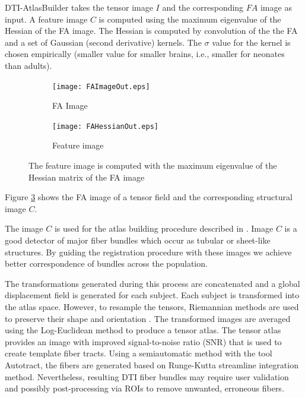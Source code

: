 \documentclass[]{spie}  %
\begin{document}
DTI-AtlasBuilder takes the tensor image $I$ and the corresponding $FA$ image as input. 
A feature image $C$ is computed using the maximum eigenvalue of the Hessian of the FA image.
The Hessian is computed by convolution of the the FA and a set of Gaussian (second derivative) kernels.
The $\sigma$ value for the kernel is chosen empirically (smaller value for smaller brains, i.e., smaller for neonates than adults). 

\begin{figure}
	\centering 

	\begin{subfigure}{0.3\textwidth}
    	\texttt{[image: FAImageOut.eps]}
    	\caption{FA Image}
    	\label{fig:FAImage}
	\end{subfigure}
	\begin{subfigure}{0.3\textwidth}
    	\texttt{[image: FAHessianOut.eps]}
    	\caption{Feature image}
    	\label{fig:FAHessian}
	\end{subfigure}
	\caption[FA and Hessian]{The feature image is computed with the maximum eigenvalue 
	of the Hessian matrix of the FA image}
	\label{fig:FA}
\end{figure} 

Figure \ref{fig:FA} shows the FA image of a tensor field and the corresponding structural image $C$.

The image $C$ is used for the atlas building procedure described in \cite{joshi2004unbiased}.
Image $C$ is a good detector of major fiber bundles which occur as tubular or sheet-like structures. 
By guiding the registration procedure with these images we achieve better correspondence of
bundles across the population. 

The transformations generated during this process are concatenated and a global displacement field is generated for each subject.
Each subject is transformed into the atlas space. However, to resample the tensors, Riemannian methods are used to preserve their shape and orientation \cite{fletcher2007riemannian}. 
The transformed images are averaged using the Log-Euclidean method to produce a tensor atlas.
The tensor atlas provides an image with improved signal-to-noise ratio (SNR) that is used to create template fiber tracts. 
Using a semiautomatic method with the tool Autotract\cite{prieto2016autotract}, the fibers are generated 
based on Runge-Kutta streamline integration method. Nevertheless, resulting DTI fiber bundles may require user validation and possibly post-processing via ROIs to remove unwanted, erroneous fibers. 
\end{document}
